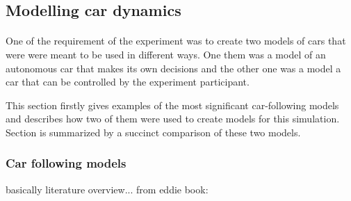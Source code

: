 \documentclass[11pt,english]{article}
\begin{document}















\subsection{Modelling car dynamics}
\paragraph{}
One of the requirement of the experiment was to create two models of cars that were were meant to be used in different ways. One them was a model of an autonomous car that makes its own decisions and the other one was a model a car that can be controlled by the experiment participant. 

\par
This section firstly gives examples of the most significant car-following models and describes how two of them were used to create models for this simulation. Section is summarized by a succinct comparison of these two models.



\subsubsection{Car following models}

basically literature overview... from eddie book:
\end{document}
